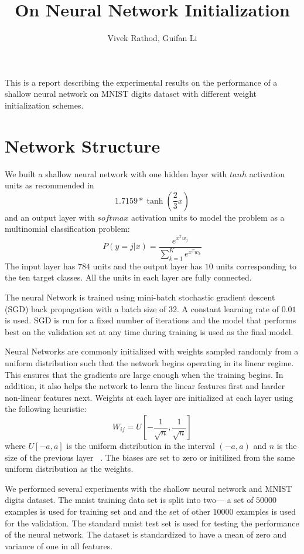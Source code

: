 \documentclass[Proceedings]{ascelike}
\begin{document}
%
\title{On Neural Network Initialization}
%
\author{
Vivek Rathod, Guifan Li
}
%
\maketitle
%

This is a report describing the experimental results on the performance of a shallow neural network on MNIST digits dataset with different weight initialization schemes.
\section{Network Structure}
\label{sec:network_struct}
We built a shallow neural network with one hidden layer with $tanh$ activation units as recommended in \cite{lecun2012efficient} \[1.7159*\tanh\left(\frac{2}{3}x\right)\] and an output layer with $softmax$ activation units to model the problem as a multinomial classification problem:\[P(y=j|x)=\frac{e^{x^{T}w_j}}{\sum_{k=1}^Ke^{x^{T}w_k}}\] The input layer has $784$ units and the output layer has $10$ units corresponding to the ten target classes. All the units in each layer are fully connected. 

\label{sec:train_method}
The neural Network is trained using mini-batch stochastic gradient descent (SGD) back propagation with a batch size of 32. A constant learning rate of $0.01$ is used. SGD is run for a fixed number of iterations and the model that performs best on the validation set at any time during training is used as the final model. 

\label{sec:weight_init}
Neural Networks are commonly initialized with weights sampled randomly from a uniform distribution such that the network begins operating in its linear regime. This ensures that the gradients are large enough when the training begins. In addition, it also helps the network to learn the linear features first and harder non-linear features next. Weights at each layer are initialized at each layer using the following heuristic: 
\[W_{ij} = U\left[-\frac{1}{\sqrt{n}},\frac{1}{\sqrt{n}}\right]\] where $U[-a, a]$ is the uniform distribution in the interval $(-a, a)$ and $n$ is the size of the previous layer ~\cite{erhan2009difficulty}. The biases are set to zero or initilized from the same uniform distribution as the weights.

We performed several experiments with the shallow neural network and MNIST digits dataset. The mnist training data set is split into two--- a set of $50000$ examples is used for training set and and the set of other $10000$ examples is used for the validation. The standard mnist test set is used for testing the performance of the neural network. The dataset is standardized to have a mean of zero and variance of one in all features.
\end{document}
